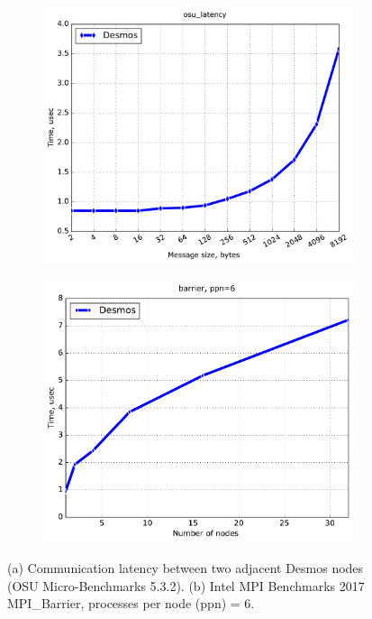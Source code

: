\documentclass{llncs}
\begin{document}
\begin{figure}[h!]
\centering
   \begin{subfigure}{0.48\textwidth}
  \includegraphics[width=1\textwidth]{img/osu_latency.pdf}\caption{}
  \end{subfigure}
  \begin{subfigure}{0.48\textwidth}
  \includegraphics[width=1\textwidth]{img/barrier_ppn=6.pdf}\caption{}
   \end{subfigure}
\caption{(a) Communication latency between two adjacent Desmos nodes (OSU Micro-Benchmarks 5.3.2). (b) Intel MPI Benchmarks 2017 MPI\_Barrier, processes per node (ppn) = 6.}
\end{figure}
\end{document}
